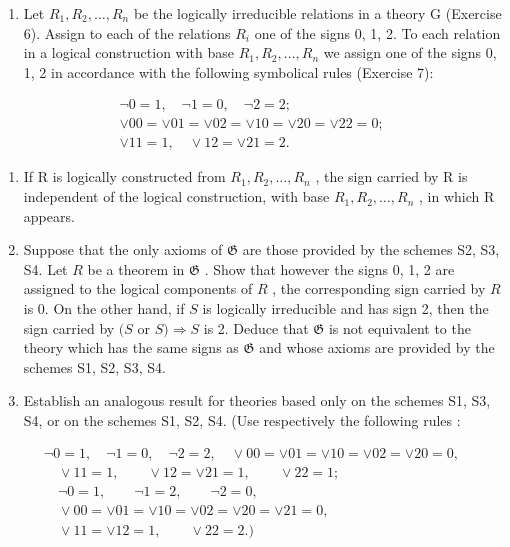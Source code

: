 \begin{enumerate}
\def\labelenumi{\arabic{enumi}.}
\setcounter{enumi}{7}
\tightlist
\item
  Let \(R_{1}, R_{2}, \ldots, R_{n}\) be the logically irreducible relations in a theory G (Exercise 6). Assign to each of the relations \(R_{i}\) one of the signs 0, 1, 2. To each relation in a logical construction with base \(R_{1}, R_{2}, \ldots, R_{n}\) we assign one of the signs 0, 1, 2 in accordance with the following symbolical rules (Exercise 7):
\end{enumerate}

\[
\begin{array}{c} \neg 0 = 1, \quad \neg 1 = 0, \quad \neg 2 = 2; \\ \lor 0 0 = \lor 0 1 = \lor 0 2 = \lor 1 0 = \lor 2 0 = \lor 2 2 = 0; \\ \lor 1 1 = 1, \quad \lor 1 2 = \lor 2 1 = 2. \end{array}
\]

\begin{enumerate}
\def\labelenumi{(\alph{enumi})}
\item
  If R is logically constructed from \(R_{1}, R_{2}, \ldots, R_{n}\) , the sign carried by R is independent of the logical construction, with base \(R_{1}, R_{2}, \ldots, R_{n}\) , in which R appears.
\item
  Suppose that the only axioms of \(\mathfrak{G}\) are those provided by the schemes S2, S3, S4. Let \(R\) be a theorem in \(\mathfrak{G}\) . Show that however the signs 0, 1, 2 are assigned to the logical components of \(R\) , the corresponding sign carried by \(R\) is 0. On the other hand, if \(S\) is logically irreducible and has sign 2, then the sign carried by \((S\) or \(S) \Longrightarrow S\) is 2. Deduce that \(\mathfrak{G}\) is not equivalent to the theory which has the same signs as \(\mathfrak{G}\) and whose axioms are provided by the schemes S1, S2, S3, S4.
\item
  Establish an analogous result for theories based only on the schemes S1, S3, S4, or on the schemes S1, S2, S4. (Use respectively the following rules :
\end{enumerate}

\[
\begin{array}{c} \neg 0 = 1, \quad \neg 1 = 0, \quad \neg 2 = 2, \quad \lor 0 0 = \lor 0 1 = \lor 1 0 = \lor 0 2 = \lor 2 0 = 0, \\ \quad \lor 1 1 = 1, \qquad \lor 1 2 = \lor 2 1 = 1, \qquad \lor 2 2 = 1; \\ \quad \neg 0 = 1, \qquad \neg 1 = 2, \qquad \neg 2 = 0, \\ \quad \lor 0 0 = \lor 0 1 = \lor 1 0 = \lor 0 2 = \lor 2 0 = \lor 2 1 = 0, \\ \quad \lor 1 1 = \lor 1 2 = 1, \qquad \lor 2 2 = 2.) \end{array}
\]

